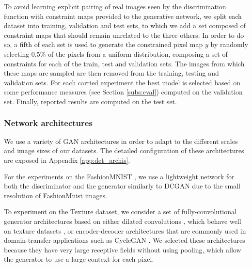 To avoid learning explicit pairing of real images seen by the discrimination function with constraint maps provided to the generative network, we split each dataset into training, validation and test sets, to which we add a set composed of constraint maps that should remain unrelated to the three others.
In order to do so, a fifth of each set is used to generate the constrained pixel map $y$ by randomly selecting $0.5\%$ of the pixels from a uniform distribution, composing a set of constraints for each of the train, test and validation sets. The images from which these maps are sampled are then removed from the training, testing and validation sets. For each carried experiment the best model is selected based on some performance measures (see Section \ref{subs:eval}) computed on the validation set. Finally, reported results are computed on the test set.



\subsubsection{Network architectures}
\label{subs:architectures}

We use a variety of GAN architectures in order to adapt to the different scales and image sizes of our datasets. The detailed configuration of these architectures are exposed in Appendix \ref{app:det_archis}.

For the experiments on the FashionMNIST \citep{Xiao2017}, we use a lightweight network for both the discriminator and the generator similarly to DCGAN  \citep{Radford2015} due to the small resolution of FashionMnist images.

To experiment on the Texture dataset, we consider a set of fully-convolutional generator architectures based on either dilated convolutions \citep{Yu2015}, which behave well on texture datasets \citep{Ruffino2017}, or encoder-decoder architectures that are commonly used in domain-transfer applications such as CycleGAN \citep{Zhu2017}. We selected these architectures because they have very large receptive fields without using pooling, which allow the generator to use a large context for each pixel.

